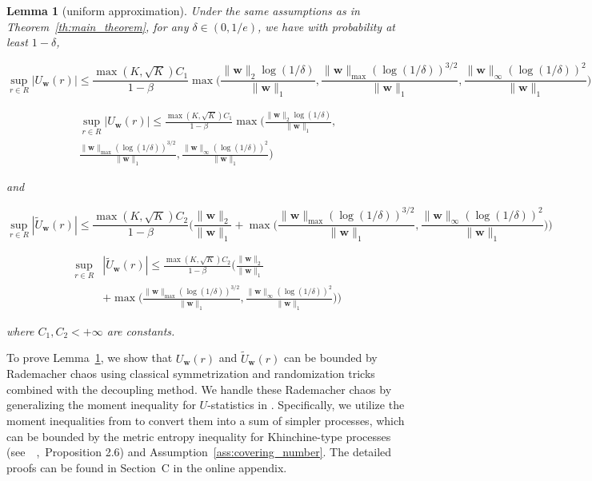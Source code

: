 \documentclass[letterpaper]{article} %
\def\DoubleColumn{}
\def\DoubleColumnEnd{}
\def\SingleColumn{}
\def\SingleColumnEnd{}
\newtheorem{lemma}{Lemma}
\newcommand{\weight}{\mathbf{w}}
\newcommand{\normo}[1]{\|#1\|_1}
\newcommand{\complexbound}{\beta}
\newcommand{\citep}[3]{(#1\ \citeauthor{#3}\ \citeyear{#3},\ #2)}
\begin{document}

\begin{lemma}[uniform approximation]
    \label{le:uniform_approximation}
    Under the same assumptions as in Theorem~\ref{th:main_theorem}, for any $\delta\in (0,1/e)$, we have with probability at least $1-\delta$,
    \SingleColumn
    \[\sup_{r\in R}|U_\weight{}(r)|\le \frac{\max(K,\sqrt{K})C_1}{1-\complexbound{}}\max\Big(\frac{\|\weight{}\|_2\log(1/\delta)}{\normo{\weight{}}},\frac{\|\weight{}\|_{\max}(\log(1/\delta))^{3/2}}{\normo{\weight{}}}, \frac{\|\weight{}\|_\infty(\log(1/\delta))^2}{\normo{\weight{}}}\Big)\]
    \SingleColumnEnd
    \DoubleColumn
    \begin{align*}
        \sup_{r\in R}|U_\weight{}(r)|\le \frac{\max(K,\sqrt{K})C_1}{1-\complexbound{}}\max\Big(\frac{\|\weight{}\|_2\log(1/\delta)}{\normo{\weight{}}},\\
        \frac{\|\weight{}\|_{\max}(\log(1/\delta))^{3/2}}{\normo{\weight{}}}, \frac{\|\weight{}\|_\infty(\log(1/\delta))^2}{\normo{\weight{}}}\Big)
    \end{align*}
    \DoubleColumnEnd
    and
    \SingleColumn
    \[\sup_{r\in R}|\widetilde{U}_\weight{}(r)|\le \frac{\max(K,\sqrt{K})C_2}{1-\complexbound{}}\bigg(\frac{\|\weight{}\|_2}{\normo{\weight{}}}+\max\Big(\frac{\|\weight{}\|_{\max}(\log(1/\delta))^{3/2}}{\normo{\weight{}}},\frac{\|\weight{}\|_\infty(\log(1/\delta))^2}{\normo{\weight{}}}\Big)\bigg)\]
    \SingleColumnEnd
    \DoubleColumn
    \begin{align*}
        \sup_{r\in R}&|\widetilde{U}_\weight{}(r)|\le \frac{\max(K,\sqrt{K})C_2}{1-\complexbound{}}\bigg(\frac{\|\weight{}\|_2}{\normo{\weight{}}}\\
        &+\max\Big(\frac{\|\weight{}\|_{\max}(\log(1/\delta))^{3/2}}{\normo{\weight{}}},\frac{\|\weight{}\|_\infty(\log(1/\delta))^2}{\normo{\weight{}}}\Big)\bigg)
    \end{align*}
    \DoubleColumnEnd
    where $C_1,C_2 < +\infty$ are constants.
\end{lemma}

To prove Lemma~\ref{le:uniform_approximation}, we show that $U_\weight{}(r)$ and $\widetilde{U}_\weight{}(r)$ can be bounded by Rademacher chaos using classical symmetrization and randomization tricks combined with the decoupling method. We handle these Rademacher chaos by generalizing the moment inequality for $U$-statistics in \cite{clemenccon2008ranking}. 
Specifically, we utilize the moment inequalities from \cite{Boucheron2005} to convert them into a sum of simpler processes, which can be bounded by the metric entropy inequality for Khinchine-type processes \citep{see}{Proposition 2.6}{Dembo1994} and Assumption~\ref{ass:covering_number}. The detailed proofs can be found in Section~C in the online appendix.
\end{document}
